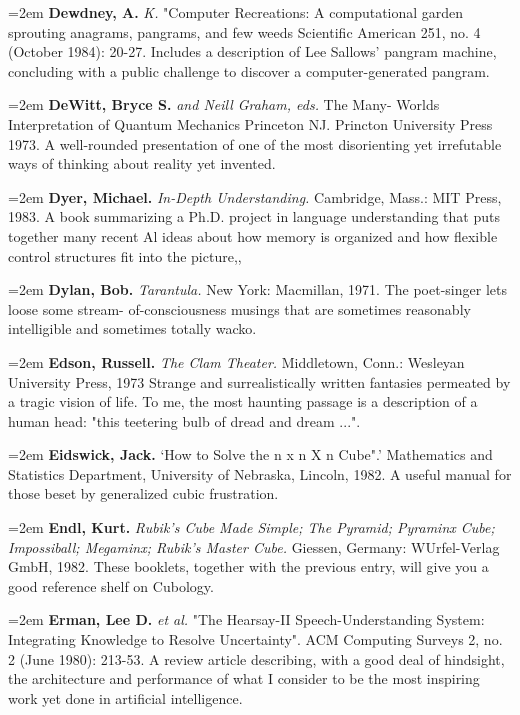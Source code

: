 \par\noindent\hangindent=2em {\bf Dewdney, A.} {\it K.} "Computer Recreations: A computational garden sprouting anagrams, pangrams, and few weeds Scientific American 251, no. 4 (October 1984): 20-27. Includes a description of Lee Sallows' pangram machine, concluding with a public challenge to discover a computer-generated pangram.

\par\noindent\hangindent=2em {\bf DeWitt, Bryce S.} {\it and Neill Graham, eds.} The Many- Worlds Interpretation of Quantum Mechanics Princeton NJ. Princton University Press 1973. A well-rounded presentation of one of the most disorienting yet irrefutable ways of thinking about reality yet invented.

\par\noindent\hangindent=2em {\bf Dyer, Michael.} {\it In-Depth Understanding.} Cambridge, Mass.: MIT Press, 1983. A book summarizing a Ph.D. project in language understanding that puts together many recent Al ideas about how memory is organized and how flexible control structures fit into the picture,,

\par\noindent\hangindent=2em {\bf Dylan, Bob.} {\it Tarantula.} New York: Macmillan, 1971. The poet-singer lets loose some stream- of-consciousness musings that are sometimes reasonably intelligible and sometimes totally wacko.

\par\noindent\hangindent=2em {\bf Edson, Russell.} {\it The Clam Theater.} Middletown, Conn.: Wesleyan University Press, 1973 Strange and surrealistically written fantasies permeated by a tragic vision of life. To me, the most haunting passage is a description of a human head: "this teetering bulb of dread and dream ...".

\par\noindent\hangindent=2em {\bf Eidswick, Jack.} `How to Solve the n x n X n Cube".' Mathematics and Statistics Department, University of Nebraska, Lincoln, 1982. A useful manual for those beset by generalized cubic frustration.

\par\noindent\hangindent=2em {\bf Endl, Kurt.} {\it Rubik's Cube Made Simple; The Pyramid; Pyraminx Cube; Impossiball; Megaminx; Rubik's Master Cube.} Giessen, Germany: WUrfel-Verlag GmbH, 1982. These booklets, together with the previous entry, will give you a good reference shelf on Cubology.

\par\noindent\hangindent=2em {\bf Erman, Lee D.} {\it et al.} "The Hearsay-II Speech-Understanding System: Integrating Knowledge to Resolve Uncertainty". ACM Computing Surveys 2, no. 2 (June 1980): 213-53. A review article describing, with a good deal of hindsight, the architecture and performance of what I consider to be the most inspiring work yet done in artificial intelligence.

